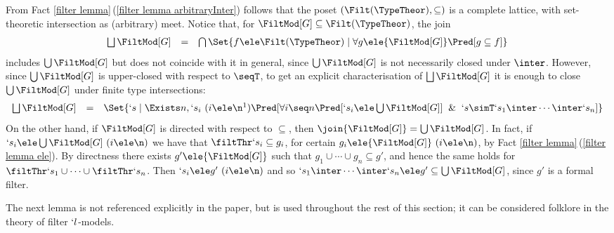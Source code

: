 \documentclass{CSML}
\def\Steffen#1{}\def\Ugo#1{}\def\Franco#1{}
\begin{document}
From Fact \ref{filter lemma}\,(\ref{filter lemma arbitraryInter}) follows that the poset $(\Filt(\TypeTheor),\subseteq)$ is a complete lattice, with set-theoretic intersection as (arbitrary) meet. 
Notice that, for ${\FiltMod[G]}\subseteq \Filt(\TypeTheor)$, the join 
%
 \[ \begin{array}{rcl}
\bigsqcup {\FiltMod[G]} &=& \bigcap \Set{f \ele \Filt(\TypeTheor) \mid \forall g \ele {\FiltMod[G]} \Pred[ g \subseteq f] }
 \end{array} \]
includes $\bigcup {\FiltMod[G]}$ but does not coincide with it in general, since $\bigcup {\FiltMod[G]}$ is not necessarily closed under $\inter$. 
However, since $\bigcup {\FiltMod[G]}$ is upper-closed with respect to $\seqT$, to get an explicit characterisation of $\bigsqcup {\FiltMod[G]}$ it is enough to close $\bigcup {\FiltMod[G]}$ under finite type intersections:
%
 \[ \begin{array}{rcl}
\bigsqcup {\FiltMod[G]} &=&
 \Set{`s \mid \Exists n, `s_i ~ (i \ele \n\footnotemark) \Pred[{ \forall i \seq n \Pred[`s_i \ele \bigcup{\FiltMod[G]} ] \And `s \simT `s_1\inter\cdots\inter`s_n }] } 
 \end{array} \] 
%
On the other hand, if ${\FiltMod[G]}$ is directed with respect to $\subseteq$, then $\join{\FiltMod[G]} =\bigcup {\FiltMod[G]}$. 
In fact, if $`s_i \ele \bigcup{\FiltMod[G]} ~ (i \ele \n)$ we have that
$\filtThr `s_i \subseteq g_i$, for certain $g_i\ele {\FiltMod[G]} ~ (i \ele \n) $, by Fact \ref{filter lemma}\,(\ref{filter lemma ele}). 
By directness there exists $g' \ele {\FiltMod[G]}$ such that $g_1 \cup \cdots \cup g_n \subseteq g'$, and hence the same holds for $\filtThr `s_1 \cup \cdots \cup \filtThr `s_n$. 
Then $`s_i \ele g' ~ (i \ele \n)$ and so $`s_1\inter\cdots\inter`s_n \ele g' \subseteq \bigcup {\FiltMod[G]}$, since $g'$ is a formal filter.


 \Steffen{The next lemma is not referenced in the paper.
Moreover, it seems that you are using some knowledge here that is unspecified.
For example, it seems you show that $\Compact(\Filt(\TypeTheor)) = \Filt_p(\TypeTheor)$; we have defined $\Filt_p(\TypeTheor)$, but not $\Compact(\Filt(\TypeTheor))$.
So how can this proof check the equality?.}

The next lemma is not referenced explicitly in the paper, but is used throughout the rest of this section; it can be considered folklore in the theory of filter $`l$-models.
\end{document}

